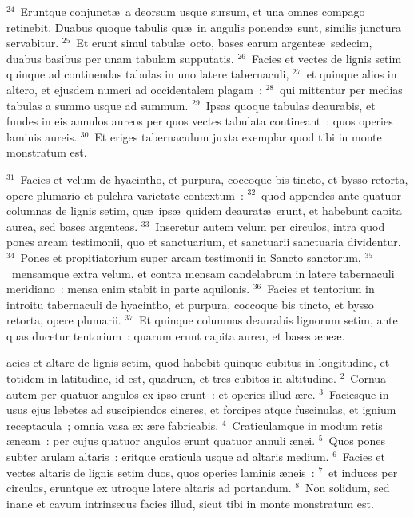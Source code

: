 ${}^{24}$~Eruntque conjunct\ae\ a deorsum usque sursum, et una omnes compago retinebit. Duabus quoque tabulis qu\ae\ in angulis ponend\ae\ sunt, similis junctura servabitur.
${}^{25}$~Et erunt simul tabul\ae\ octo, bases earum argente\ae\ sedecim, duabus basibus per unam tabulam supputatis.
${}^{26}$~Facies et vectes de lignis setim quinque ad continendas tabulas in uno latere tabernaculi,
${}^{27}$~et quinque alios in altero, et ejusdem numeri ad occidentalem plagam~:
${}^{28}$~qui mittentur per medias tabulas a summo usque ad summum.
${}^{29}$~Ipsas quoque tabulas deaurabis, et fundes in eis annulos aureos per quos vectes tabulata contineant~: quos operies laminis aureis.
${}^{30}$~Et eriges tabernaculum juxta exemplar quod tibi in monte monstratum est.


${}^{31}$~Facies et velum de hyacintho, et purpura, coccoque bis tincto, et bysso retorta, opere plumario et pulchra varietate contextum~:
${}^{32}$~quod appendes ante quatuor columnas de lignis setim, qu\ae\ ips\ae\ quidem deaurat\ae\ erunt, et habebunt capita aurea, sed bases argenteas.
${}^{33}$~Inseretur autem velum per circulos, intra quod pones arcam testimonii, quo et sanctuarium, et sanctuarii sanctuaria dividentur.
${}^{34}$~Pones et propitiatorium super arcam testimonii in Sancto sanctorum,
${}^{35}$~mensamque extra velum, et contra mensam candelabrum in latere tabernaculi meridiano~: mensa enim stabit in parte aquilonis.
${}^{36}$~Facies et tentorium in introitu tabernaculi de hyacintho, et purpura, coccoque bis tincto, et bysso retorta, opere plumarii.
${}^{37}$~Et quinque columnas deaurabis lignorum setim, ante quas ducetur tentorium~: quarum erunt capita aurea, et bases \ae ne\ae .

\bchapter
{}acies et altare de lignis setim, quod habebit quinque cubitus in longitudine, et totidem in latitudine, id est, quadrum, et tres cubitos in altitudine.
${}^{2}$~Cornua autem per quatuor angulos ex ipso erunt~: et operies illud \ae re.
${}^{3}$~Faciesque in usus ejus lebetes ad suscipiendos cineres, et forcipes atque fuscinulas, et ignium receptacula~; omnia vasa ex \ae re fabricabis.
${}^{4}$~Craticulamque in modum retis \ae neam~: per cujus quatuor angulos erunt quatuor annuli \ae nei.
${}^{5}$~Quos pones subter arulam altaris~: eritque craticula usque ad altaris medium.
${}^{6}$~Facies et vectes altaris de lignis setim duos, quos operies laminis \ae neis~:
${}^{7}$~et induces per circulos, eruntque ex utroque latere altaris ad portandum.
${}^{8}$~Non solidum, sed inane et cavum intrinsecus facies illud, sicut tibi in monte monstratum est.


